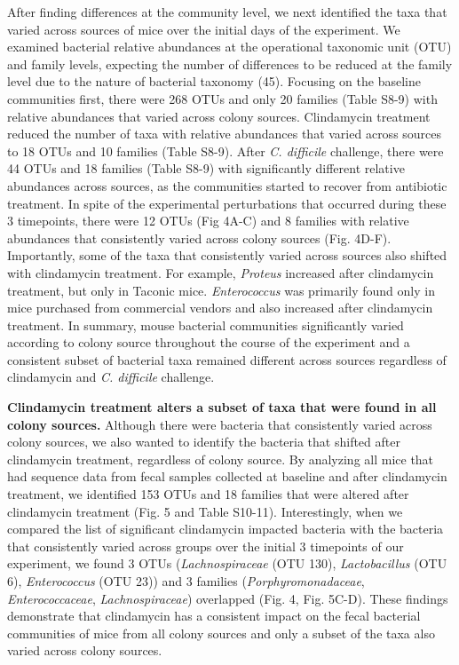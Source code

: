 \documentclass[11pt,]{article}
\begin{document}
After finding differences at the community level, we next identified the
taxa that varied across sources of mice over the initial days of the
experiment. We examined bacterial relative abundances at the operational
taxonomic unit (OTU) and family levels, expecting the number of
differences to be reduced at the family level due to the nature of
bacterial taxonomy (45). Focusing on the baseline communities first,
there were 268 OTUs and only 20 families (Table S8-9) with relative
abundances that varied across colony sources. Clindamycin treatment
reduced the number of taxa with relative abundances that varied across
sources to 18 OTUs and 10 families (Table S8-9). After \emph{C.
difficile} challenge, there were 44 OTUs and 18 families (Table S8-9)
with significantly different relative abundances across sources, as the
communities started to recover from antibiotic treatment. In spite of
the experimental perturbations that occurred during these 3 timepoints,
there were 12 OTUs (Fig 4A-C) and 8 families with relative abundances
that consistently varied across colony sources (Fig. 4D-F). Importantly,
some of the taxa that consistently varied across sources also shifted
with clindamycin treatment. For example, \emph{Proteus} increased after
clindamycin treatment, but only in Taconic mice. \emph{Enterococcus} was
primarily found only in mice purchased from commercial vendors and also
increased after clindamycin treatment. In summary, mouse bacterial
communities significantly varied according to colony source throughout
the course of the experiment and a consistent subset of bacterial taxa
remained different across sources regardless of clindamycin and \emph{C.
difficile} challenge.

\textbf{Clindamycin treatment alters a subset of taxa that were found in
all colony sources.} Although there were bacteria that consistently
varied across colony sources, we also wanted to identify the bacteria
that shifted after clindamycin treatment, regardless of colony source.
By analyzing all mice that had sequence data from fecal samples
collected at baseline and after clindamycin treatment, we identified 153
OTUs and 18 families that were altered after clindamycin treatment (Fig.
5 and Table S10-11). Interestingly, when we compared the list of
significant clindamycin impacted bacteria with the bacteria that
consistently varied across groups over the initial 3 timepoints of our
experiment, we found 3 OTUs (\emph{Lachnospiraceae} (OTU 130),
\emph{Lactobacillus} (OTU 6), \emph{Enterococcus} (OTU 23)) and 3
families (\emph{Porphyromonadaceae}, \emph{Enterococcaceae},
\emph{Lachnospiraceae}) overlapped (Fig. 4, Fig. 5C-D). These findings
demonstrate that clindamycin has a consistent impact on the fecal
bacterial communities of mice from all colony sources and only a subset
of the taxa also varied across colony sources.
\end{document}
